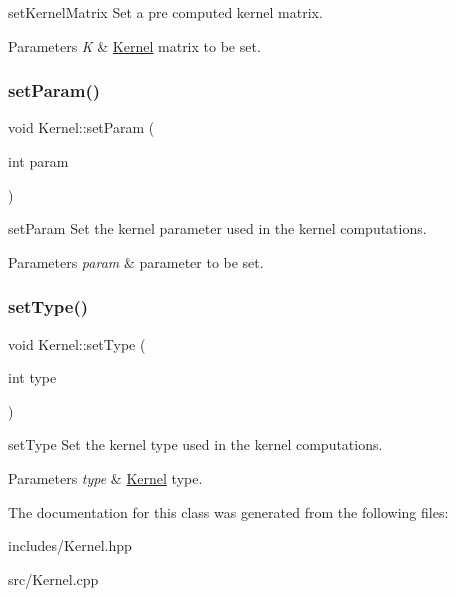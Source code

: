 set\+Kernel\+Matrix Set a pre computed kernel matrix. 


\begin{DoxyParams}{Parameters}
{\em K} & \hyperlink{class_kernel}{Kernel} matrix to be set. \\
\hline
\end{DoxyParams}
\mbox{\label{class_kernel_a4fe711ebdbc168be1733fbb8aea6cf92}} 
\subsubsection{\texorpdfstring{set\+Param()}{setParam()}}
{\footnotesize\ttfamily void Kernel\+::set\+Param (\begin{DoxyParamCaption}\item[{int}]{param }\end{DoxyParamCaption})}



set\+Param Set the kernel parameter used in the kernel computations. 


\begin{DoxyParams}{Parameters}
{\em param} & parameter to be set. \\
\hline
\end{DoxyParams}
\mbox{\label{class_kernel_ad01e209470accf44ea240078f39fb127}} 
\subsubsection{\texorpdfstring{set\+Type()}{setType()}}
{\footnotesize\ttfamily void Kernel\+::set\+Type (\begin{DoxyParamCaption}\item[{int}]{type }\end{DoxyParamCaption})}



set\+Type Set the kernel type used in the kernel computations. 


\begin{DoxyParams}{Parameters}
{\em type} & \hyperlink{class_kernel}{Kernel} type. \\
\hline
\end{DoxyParams}


The documentation for this class was generated from the following files\+:\begin{DoxyCompactItemize}
\item 
includes/Kernel.\+hpp\item 
src/Kernel.\+cpp\end{DoxyCompactItemize}
